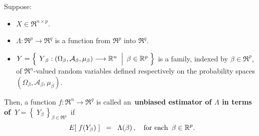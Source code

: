 \begin{definition}
\mbox{}\vskip 0.1cm\noindent
Suppose:
\begin{itemize}
\item
	$X \in \Re^{n \times p}$.
\item
	$\Lambda : \Re^{p} \longrightarrow \Re^{q}$ is a function from $\Re^{p}$ into $\Re^{q}$.
\item
	$Y = \left\{\;
		\left.
		\overset{{\color{white}.}}{Y}_{\beta} : (\Omega_{\beta},\mathcal{A}_{\beta},\mu_{\beta}) \longrightarrow \Re^{n}
		\;\;\right\vert\;
		\beta \in \Re^{p}
		\;\right\}$
	is a family, indexed by $\beta \in \Re^{p}$,
	of $\Re^{n}$-valued random variables defined respectively on the
	probability spaces $(\Omega_{\beta},\mathcal{A}_{\beta},\mu_{\beta})$.
\end{itemize}
Then,
a function $f : \Re^{n} \longrightarrow \Re^{q}$ is called an
\,{\color{red}\textbf{unbiased estimator of $\Lambda$ in terms of \,$Y = \left\{\;Y_{\beta}\,\right\}_{\beta\in\Re^{p}}$}}\,
if
\begin{equation*}
E\!\left[\;f(Y_{\beta})\;\right] \;\; =\;\; \Lambda(\beta)\,,
\quad
\textnormal{for each \,$\beta \in \Re^{p}$}.
\end{equation*}
\end{definition}

